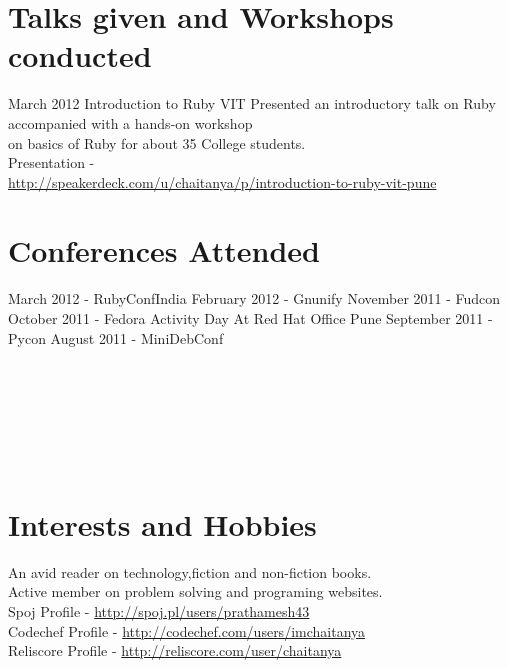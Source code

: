 \documentclass[11pt,a4paper]{moderncv}
\begin{document}
\section{Talks given and Workshops conducted}
\cventry
        {March 2012}
        {Introduction to Ruby}
        {VIT}
        {}
        {}
        {
         Presented an introductory talk on Ruby accompanied with a 
         hands-on workshop \\
         on basics of Ruby for about 35 College students.\\
         Presentation - \\
         \url{http://speakerdeck.com/u/chaitanya/p/introduction-to-ruby-vit-pune}
        }

\section{Conferences Attended}

\cvlistitem
         {March 2012 - RubyConfIndia }
\cvlistitem
         {February 2012 - Gnunify }
\cvlistitem
         {November 2011 - Fudcon }
\cvlistitem
         {October 2011 - Fedora Activity Day At Red Hat Office Pune}
\cvlistitem
         {September 2011 - Pycon}
\cvlistitem
         {August 2011 - MiniDebConf }\\\\\\\\\\\\\\

\section{Interests and Hobbies}

\cvlistitem
           {An avid reader on technology,fiction and non-fiction books.\\}
\cvlistitem
           {
            Active member on problem solving and programing websites.\\
            Spoj Profile -          \url{http://spoj.pl/users/prathamesh43}   \\
            Codechef Profile -      \url{http://codechef.com/users/imchaitanya}\\
            Reliscore Profile -     \url{http://reliscore.com/user/chaitanya}
          }
\end{document}
